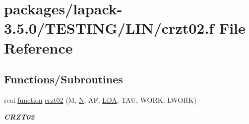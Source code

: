 \hypertarget{crzt02_8f}{}\section{packages/lapack-\/3.5.0/\+T\+E\+S\+T\+I\+N\+G/\+L\+I\+N/crzt02.f File Reference}
\label{crzt02_8f}
\subsection*{Functions/\+Subroutines}
\begin{DoxyCompactItemize}
\item 
real \hyperlink{afunc_8m_a7b5e596df91eadea6c537c0825e894a7}{function} \hyperlink{group__complex__lin_gaea0244eedc9f073dc522d4183de1a34e}{crzt02} (M, \hyperlink{polmisc_8c_a0240ac851181b84ac374872dc5434ee4}{N}, A\+F, \hyperlink{example__user_8c_ae946da542ce0db94dced19b2ecefd1aa}{L\+D\+A}, T\+A\+U, W\+O\+R\+K, L\+W\+O\+R\+K)
\begin{DoxyCompactList}\small\item\em {\bfseries C\+R\+Z\+T02} \end{DoxyCompactList}\end{DoxyCompactItemize}
